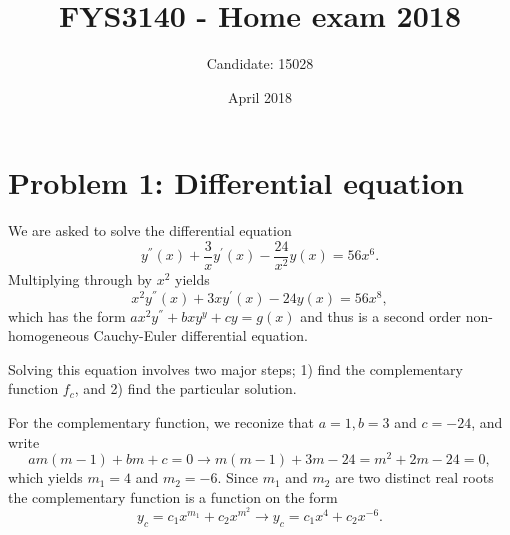 \documentclass{article}
\title{FYS3140 - Home exam 2018}
\author{Candidate: 15028}
\date{April 2018}
\begin{document}
\maketitle

\section*{Problem 1: Differential equation}


We are asked to solve the differential equation
\begin{equation}
y^{''}(x) + \frac{3}{x}y^{'}(x) - \frac{24}{x^2}y(x) = 56x^6.
\end{equation}
Multiplying through by $x^2$ yields
\begin{equation}
x^2y^{''}(x) + 3xy^{'}(x) - 24y(x) = 56x^8,
\end{equation}
which has the form $ax^2y^{''} + bxy^{y} + cy = g(x)$ and thus is a second order non-homogeneous Cauchy-Euler differential equation.

Solving this equation involves two major steps; 1) find the complementary function $f_c$, and 2) find the particular solution.

For the complementary function, we reconize that $a = 1, b = 3$ and $c = -24$, and write 
\begin{equation}
am(m-1) + bm + c = 0 \rightarrow m(m-1) + 3m -24 = m^2 + 2m -24 = 0,
\end{equation}
which yields $m_1 = 4$ and $m_2 = -6$. Since $m_1$ and $m_2$ are two distinct real roots the complementary function is a function on the form
\begin{equation}
y_c = c_1x^{m_1} + c_2x^{m^2} \rightarrow y_c = c_1x^{4} + c_2x^{-6}.
\end{equation}
\end{document}
